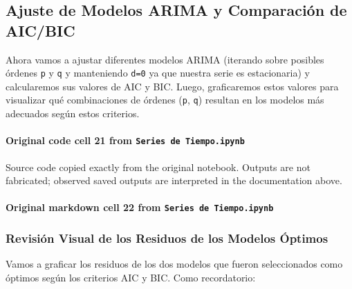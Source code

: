 \documentclass[
  11pt,
]{article}
\newenvironment{Shaded}{}{}
\begin{document}
\subsection{Ajuste de Modelos ARIMA y Comparación de AIC/BIC}\label{ajuste-de-modelos-arima-y-comparaciuxf3n-de-aicbic}

Ahora vamos a ajustar diferentes modelos ARIMA (iterando sobre posibles órdenes \texttt{p} y \texttt{q} y manteniendo \texttt{d=0} ya que nuestra serie es estacionaria) y calcularemos sus valores de AIC y BIC. Luego, graficaremos estos valores para visualizar qué combinaciones de órdenes (\texttt{p}, \texttt{q}) resultan en los modelos más adecuados según estos criterios.

\paragraph{\texorpdfstring{Original code cell 21 from \texttt{Series\ de\ Tiempo.ipynb}}{Original code cell 21 from Series de Tiempo.ipynb}}\label{original-code-cell-21-from-series-de-tiempoipynb}

Source code copied exactly from the original notebook. Outputs are not fabricated; observed saved outputs are interpreted in the documentation above.

\begin{Shaded}
\begin{Highlighting}[]

\end{Highlighting}
\end{Shaded}

\paragraph{\texorpdfstring{Original markdown cell 22 from \texttt{Series\ de\ Tiempo.ipynb}}{Original markdown cell 22 from Series de Tiempo.ipynb}}\label{original-markdown-cell-22-from-series-de-tiempoipynb}

\subsubsection{Revisión Visual de los Residuos de los Modelos Óptimos}\label{revisiuxf3n-visual-de-los-residuos-de-los-modelos-uxf3ptimos}

Vamos a graficar los residuos de los dos modelos que fueron seleccionados como \textquotesingle óptimos\textquotesingle{} según los criterios AIC y BIC. Como recordatorio:
\end{document}
